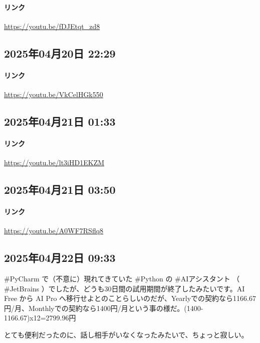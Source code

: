 \paragraph{リンク}
\url{https://youtu.be/fDJEtqt_zd8}

\subsection*{2025年04月20日 22:29}

\paragraph{リンク}
\url{https://youtu.be/VkCelHGk550}

\subsection*{2025年04月21日 01:33}

\paragraph{リンク}
\url{https://youtu.be/lt3iHD1EKZM}

\subsection*{2025年04月21日 03:50}

\paragraph{リンク}
\url{https://youtu.be/A0WF7RSflq8}

\subsection*{2025年04月22日 09:33}

\#PyCharm で（不意に）現れてきていた \#Python の \#AIアシスタント （ \#JetBrains ）でしたが、どうも30日間の試用期間が終了したみたいです。AI Free から AI Pro へ移行せよとのことらしいのだが、Yearlyでの契約なら1166.67円/月、Monthlyでの契約なら1400円/月という事の様だ。(1400-1166.67)x12=2799.96円

とても便利だったのに、話し相手がいなくなったみたいで、ちょっと寂しい。

